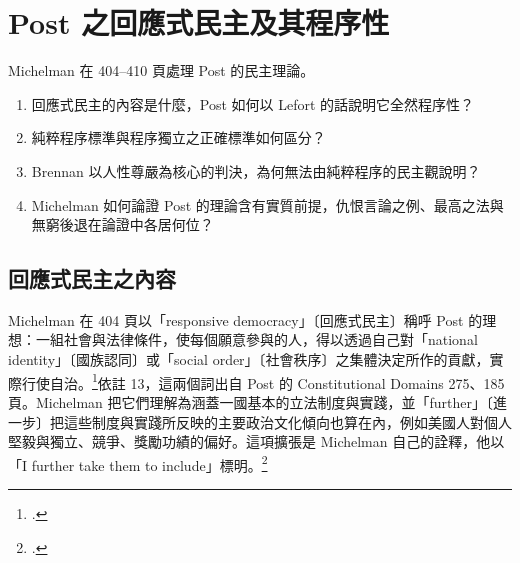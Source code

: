 \chapter{Post 之回應式民主及其程序性}
\label{ch:20_responsive}

\begin{qaquestion}
Michelman 在 404--410 頁處理 Post 的民主理論。
\begin{enumerate}
\tightlist
\item 回應式民主的內容是什麼，Post 如何以 Lefort 的話說明它全然程序性？
\item 純粹程序標準與程序獨立之正確標準如何區分？
\item Brennan 以人性尊嚴為核心的判決，為何無法由純粹程序的民主觀說明？
\item Michelman 如何論證 Post 的理論含有實質前提，仇恨言論之例、最高之法與無窮後退在論證中各居何位？
\end{enumerate}
\end{qaquestion}

\section{回應式民主之內容}
\label{sec:20_responsive-1}

Michelman 在 404 頁以「responsive democracy」〔回應式民主〕稱呼 Post 的理想：一組社會與法律條件，使每個願意參與的人，得以透過自己對「national identity」〔國族認同〕或「social order」〔社會秩序〕之集體決定所作的貢獻，實際行使自治。\footcite[404 \& nn.12--13]{michelman1998}依註 13，這兩個詞出自 Post 的 Constitutional Domains 275、185 頁。Michelman 把它們理解為涵蓋一國基本的立法制度與實踐，並「further」〔進一步〕把這些制度與實踐所反映的主要政治文化傾向也算在內，例如美國人對個人堅毅與獨立、競爭、獎勵功績的偏好。這項擴張是 Michelman 自己的詮釋，他以「I further take them to include」標明。\footcite[404]{michelman1998}

